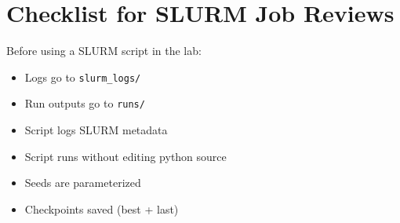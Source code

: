 \documentclass[11pt]{article}
\begin{document}
\section{Checklist for SLURM Job Reviews}
Before using a SLURM script in the lab:
\begin{itemize}
    \item Logs go to \texttt{slurm\_logs/}
    \item Run outputs go to \texttt{runs/}
    \item Script logs SLURM metadata
    \item Script runs without editing python source
    \item Seeds are parameterized
    \item Checkpoints saved (best + last)
\end{itemize}
\end{document}
